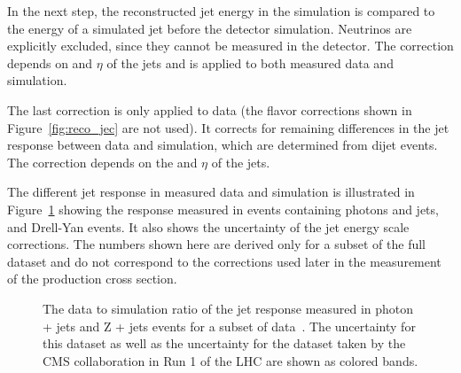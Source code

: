 In the next step, the reconstructed jet energy in the simulation is compared to the energy of a simulated jet before the detector simulation. Neutrinos are explicitly excluded, since they cannot be measured in the detector.
The correction depends on \pt and $\eta$ of the jets and is applied to both measured data and simulation.

The last correction is only applied to data (the flavor corrections shown in Figure~\ref{fig:reco_jec} are not used). It corrects for remaining differences in the jet response between data and simulation, which are determined
from dijet events. The correction depends on the \pt and $\eta$ of the jets.

The different jet response in measured data and simulation is illustrated in Figure~\ref{fig:reco_jetresponse} showing the response measured in events containing photons and jets, and Drell-Yan events.
It also shows the uncertainty of the jet energy scale corrections. The numbers shown here are derived only for a subset of the full dataset and do not correspond to the corrections used later in the measurement of the \ttbar production cross section.

\begin{figure}[htbp!]
  \begin{center}
\caption{The data to simulation ratio of the jet response measured in photon + jets and Z + jets events for a subset of data~\cite{CMS-DP-2016-020}. The uncertainty for this dataset as well as the uncertainty for the dataset taken by the CMS collaboration
in Run 1 of the LHC are shown as colored bands. 
  \label{fig:reco_jetresponse}}
  \end{center}
\end{figure}


